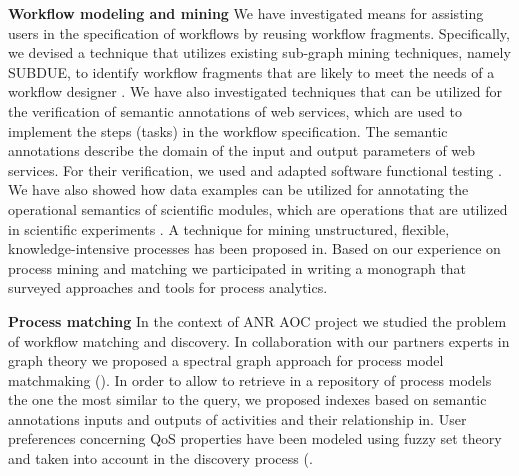 \textbf{Workflow modeling and mining}
We have investigated means for assisting users in the specification of workflows by reusing workflow fragments. Specifically, we devised a technique that utilizes existing sub-graph mining techniques, namely SUBDUE, to identify workflow fragments that are likely to meet the needs of a workflow designer \cite{DBLP:conf/cost/HarmassiGB15}. We have also investigated techniques that can be utilized for the verification of semantic annotations of web services, which are used to implement the steps (tasks) in the workflow specification. The semantic annotations describe the domain of the input and output parameters of web services. For their verification, we used and adapted software functional testing \cite{DBLP:journals/tsc/BelhajjameEP14}. We have also showed how data examples can be utilized for annotating the operational semantics of scientific modules, which are operations that are utilized in scientific experiments \cite{DBLP:conf/edbt/Belhajjame14}.  
A technique for mining unstructured, flexible, knowledge-intensive processes has been proposed in\cite{Delias2015Discovering-1223048}.  Based on our experience on process mining and matching we participated in writing a monograph \cite{DBLP:books/sp/BeheshtiBSGMBGR16} that surveyed  approaches and tools for process analytics.


\textbf{Process matching} 
In the context of ANR AOC project we studied the problem of workflow matching and discovery. In collaboration with our partners experts in graph theory we proposed a spectral graph approach for process model matchmaking  (\cite{DBLP:conf/IEEEscc/BelhoulHGGKB13}). In order to allow to retrieve in a repository of process models the one the most similar to the query, we proposed indexes based on semantic annotations inputs and outputs of activities and their relationship in\cite{Gater2012Indexing-624941}. User preferences concerning QoS properties have been modeled using fuzzy set theory and taken into account in the discovery process (\cite{Bouzeghoub2012Integration-624705,Grigori2012Adding-619546,Bouzeghoub2012A-619531}.


